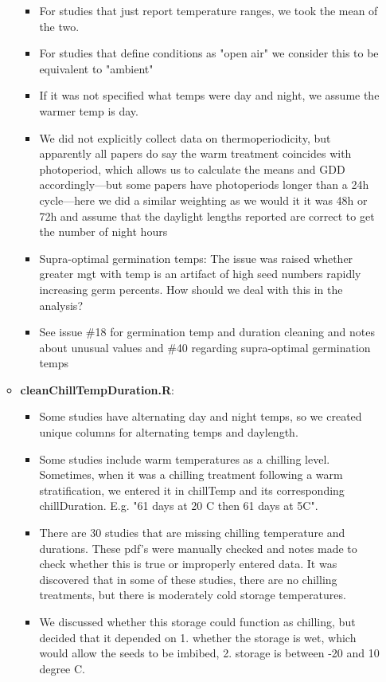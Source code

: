 \documentclass{article}[12pt]
\begin{document}
\begin{enumerate}
\begin{itemize}
\begin{itemize}
\item For studies that just report temperature ranges, we took the mean of the two. 
\item For studies that define conditions as "open air" we consider this to be equivalent to "ambient"
\item If it was not specified what temps were day and night, we assume the warmer temp is day. 
\item We did not explicitly collect data on thermoperiodicity, but apparently all papers do say the warm treatment coincides with photoperiod, which allows us to calculate the means and GDD accordingly---but some papers have photoperiods longer than a 24h cycle---here we did a similar weighting as we would it it was 48h or 72h and assume that the daylight lengths reported are correct to get the number of night hours 
\item Supra-optimal germination temps: The issue was raised whether greater mgt with temp is an artifact of high seed numbers rapidly increasing germ percents. How should we deal with this in the analysis?
\item See issue \#18 for germination temp and duration cleaning and notes about unusual values and \#40 regarding supra-optimal germination temps
\end{itemize}
\item \textbf{cleanChillTempDuration.R}: 
\begin{itemize}
\item Some studies have alternating day and night temps, so we created unique columns for alternating temps and daylength. %
\item Some studies include warm temperatures as a chilling level. Sometimes, when it was a chilling treatment following a warm stratification, we entered it in chillTemp and its corresponding chillDuration. E.g.  "61 days at 20 C then 61 days at 5C". 
\item There are 30 studies that are missing chilling temperature and durations. These pdf's were manually checked and notes made to check whether this is true or improperly entered data. It was discovered that in some of these studies, there are no chilling treatments, but there is moderately cold storage temperatures. 
\item We discussed whether this storage could function as chilling, but decided that it depended on 1. whether the storage is wet, which would allow the seeds to be imbibed, 2. storage is between -20 and 10 degree C. 

\end{itemize}
\end{itemize}
\end{enumerate}
\end{document}
